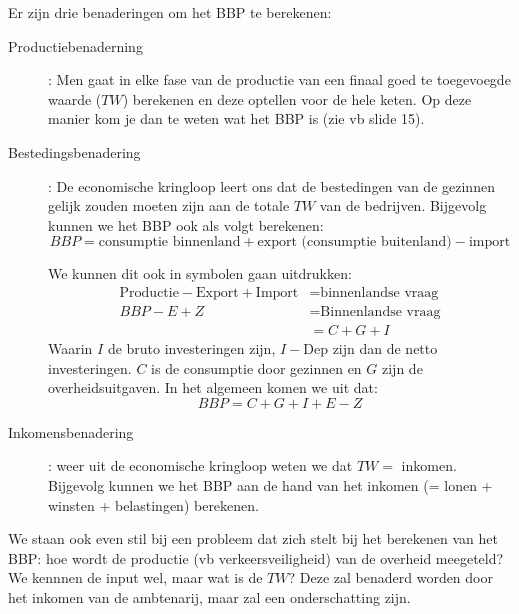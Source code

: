 Er zijn drie benaderingen om het BBP te berekenen:
\begin{description}
    \item[Productiebenaderning]: Men gaat in elke fase van de productie van een finaal goed te toegevoegde waarde ($TW$) berekenen en deze optellen voor de hele keten. Op deze manier kom je dan te weten wat het BBP is (zie vb slide 15).

    \item[Bestedingsbenadering]: De economische kringloop leert ons dat de bestedingen van de gezinnen gelijk zouden moeten zijn aan de totale $TW$ van de bedrijven. Bijgevolg kunnen we het BBP ook als volgt berekenen:
    \begin{equation}
        BBP = \text{consumptie binnenland} + \text{export (consumptie buitenland)} - \text{import}
    \end{equation}

    We kunnen dit ook in symbolen gaan uitdrukken:
    \begin{align*}
        \text{Productie} - \text{Export} + \text{Import} &= \text{binnenlandse vraag}\\
        BBP - E + Z &= \text{Binnenlandse vraag}\\
        &= C + G + I
    \end{align*}
    Waarin $I$ de bruto investeringen zijn, $I - \text{Dep}$ zijn dan de netto investeringen. $C$ is de consumptie door gezinnen en $G$ zijn de overheidsuitgaven. In het algemeen komen we uit dat:
    \begin{equation}
        BBP = C + G + I + E - Z
    \end{equation}

    \item[Inkomensbenadering]: weer uit de economische kringloop weten we dat $TW =$ inkomen. Bijgevolg kunnen we het BBP aan de hand van het inkomen (= lonen + winsten + belastingen) berekenen.
\end{description}

We staan ook even stil bij een probleem dat zich stelt bij het berekenen van het BBP: hoe wordt de productie (vb verkeersveiligheid) van de overheid meegeteld? We kennnen de input wel, maar wat is de $TW$? Deze zal benaderd worden door het inkomen van de ambtenarij, maar zal een onderschatting zijn.



